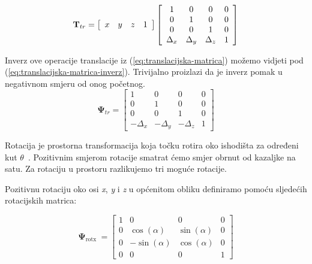 \documentclass[times, utf8, diplomskirad]{fer}
\begin{document}
\begin{equation}
\bold T_{t r}=
\left[
    \begin{array}{cccc}
        x & y & z & 1 \\
    \end{array}
    \right]
\left[
    \begin{array}{cccc}
        1 & 0 & 0 & 0 \\
        0 & 1 & 0 & 0 \\
        0 & 0 & 1 & 0 \\
        \Delta_x & \Delta_y & \Delta_z & 1
    \end{array}
    \right]
    \label{eq:translacijska-matrica-full}
\end{equation}


Inverz ove operacije translacije iz (\ref{eq:translacijska-matrica}) možemo vidjeti pod (\ref{eq:translacijska-matrica-inverz}).
Trivijalno proizlazi da je inverz pomak u negativnom smjeru od onog početnog.
\begin{equation}
    \boldsymbol{\Psi}_{t r}=\left[
        \begin{array}{cccc}
            1 & 0 & 0 & 0 \\
            0 & 1 & 0 & 0 \\
            0 & 0 & 1 & 0 \\
            -\Delta_x & -\Delta_y & -\Delta_z & 1
        \end{array}
        \right]
    \label{eq:translacijska-matrica-inverz}
\end{equation}

\newpage
Rotacija je prostorna transformacija koja točku rotira oko ishodišta za određeni kut $\theta$~\cite{book:irg}.
Pozitivnim smjerom rotacije smatrat ćemo smjer obrnut od kazaljke na satu.
Za rotaciju u prostoru razlikujemo tri moguće rotacije.

Pozitivnu rotaciju oko osi \textit{x}, \textit{y} i \textit{z} u općenitom obliku definiramo pomoću sljedećih rotacijskih matrica:

\begin{equation}
    \boldsymbol{\Psi}_{\text {rotx }}=\left[\begin{array}{cccc}
    1 & 0 & 0 & 0 \\
    0 & \cos (\alpha) & \sin (\alpha) & 0 \\
    0 & -\sin (\alpha) & \cos (\alpha) & 0 \\
    0 & 0 & 0 & 1
    \end{array}\right]
    \label{eq:rotacija-x-matrica}
\end{equation}
\end{document}
